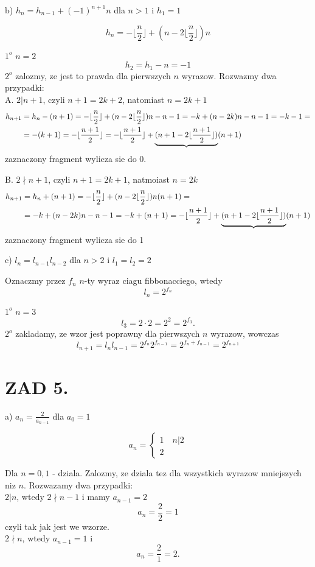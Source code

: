 \documentclass{article}[13pt]
\begin{document}
    b) $h_n=h_{n-1}+(-1)^{n+1}n$ dla $n>1$ i $h_1=1$

    $$h_n=-\lfloor\frac n2\rfloor+(n-2\lfloor\frac n2\rfloor)n$$

    \indent $1^o$ $n=2$
    $$h_2=h_1-n=-1$$
    \indent $2^o$ zalozmy, ze jest to prawda dla pierwszych $n$ wyrazow. Rozwazmy dwa przypadki:\smallskip\\
    A. $2|n+1$, czyli $n+1=2k+2$, natomiast $n=2k+1$
    \begin{align*}
        h_{n+1}&=h_n-(n+1)=-\lfloor\frac n2\rfloor+(n-2\lfloor\frac n2\rfloor)n-n-1=-k+(n-2k)n-n-1=-k-1=\\
        &=-(k+1)=-\lfloor{n+1\over 2}\rfloor = -\lfloor{n+1\over2}\rfloor+\underbrace{(n+1-2\lfloor\frac{n+1}2\rfloor)}(n+1)
    \end{align*}
    zaznaczony fragment wylicza sie do 0.

    B. $2\nmid n+1$, czyli $n+1=2k+1$, natmoiast $n=2k$
    \begin{align*}
        h_{n+1}&=h_n+(n+1)=-\lfloor\frac n2\rfloor+(n-2\lfloor\frac n2\rfloor)n(n+1)=\\
        &=-k+(n-2k)n-n-1=-k+(n+1)=-\lfloor {n+1\over 2}\rfloor +\underbrace{(n+1-2\lfloor\frac{n+1}2\rfloor)}(n+1)
    \end{align*}
    zaznaczony fragment wylicza sie do 1
    \medskip

    c) $l_n=l_{n-1}l_{n-2}$ dla $n>2$ i $l_1=l_2=2$

    Oznaczmy przez $f_n$ $n$-ty wyraz ciagu fibbonacciego, wtedy
    $$l_n=2^{f_n}$$

    \indent $1^o$ $n=3$
    $$l_3=2\cdot 2=2^2=2^{f_3}.$$
    \indent $2^o$ zakladamy, ze wzor jest poprawny dla pierwszych $n$ wyrazow, wowczas
    $$l_{n+1}=l_nl_{n-1}=2^{f_n}2^{f_{n-1}}=2^{f_n+f_{n-1}}=2^{f_{n+1}}$$


    \section*{ZAD 5.}

    a) $a_n=\frac 2{a_{n-1}}$ dla $a_0=1$

    $$a_n=\begin{cases}
        1\quad n|2\\
        2
    \end{cases}$$

    Dla $n=0, 1$ - dziala. Zalozmy, ze dziala tez dla wszystkich wyrazow mniejszych niz $n$. Rozwazamy dwa przypadki:\smallskip\\
    \indent $2|n$, wtedy $2\nmid n-1$ i mamy $a_{n-1}=2$
    $$a_n=\frac22=1$$
    czyli tak jak jest we wzorze.\smallskip\\
    \indent $2\nmid n$, wtedy $a_{n-1}=1$ i
    $$a_n=\frac21=2.$$
\end{document}
